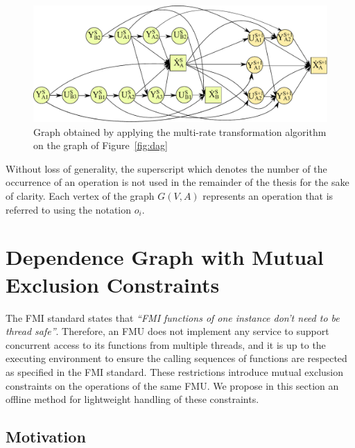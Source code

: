 \begin{figure}[htb]
\centering
  \includegraphics[scale=0.5]{figures/Operation_Graph_Two_Models_Multirate}
\caption{Graph obtained by applying the multi-rate transformation algorithm on the graph of Figure~\ref{fig:dag}}
\label{fig:dagmr}
\end{figure}

Without loss of generality, the superscript which denotes the number of the occurrence of an operation is not used in the remainder of the thesis for the sake of clarity. Each vertex of the graph $G(V,A)$ represents an operation that is referred to using the notation $o_i$.

\section{Dependence Graph with Mutual Exclusion Constraints}
The FMI standard states that \textit{``FMI functions of one instance don't need to be thread safe''}. Therefore, an FMU does not implement any service to support concurrent access to its functions from multiple threads, and it is up to the executing environment to ensure the calling sequences of functions are respected as specified in the FMI standard. These restrictions introduce mutual exclusion constraints on the operations of the same FMU. We propose in this section an offline method for lightweight handling of these constraints.

\subsection{Motivation}

